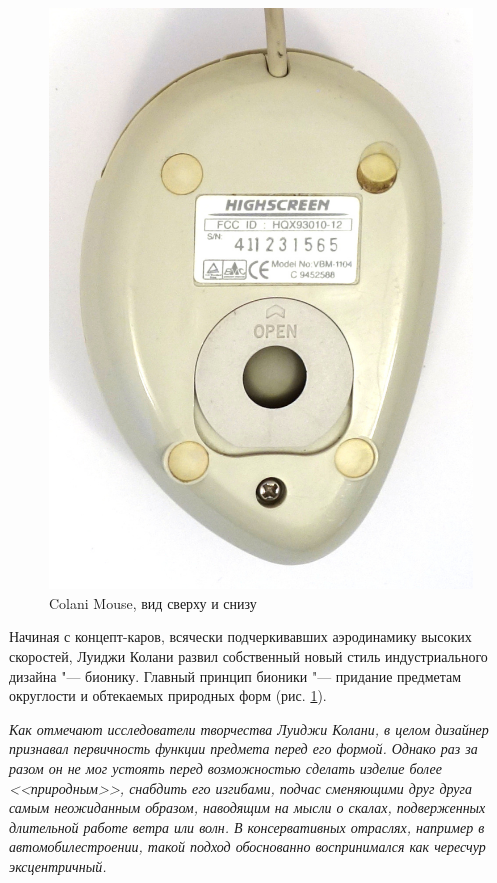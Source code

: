 \documentclass[11pt, a4paper]{article}
\begin{document}
\begin{figure}[h]
    \includegraphics[scale=0.5]{1993_colani_mouse/bottom_30.jpg}
    \caption{Colani Mouse, вид сверху и снизу}
    \label{fig:ColaniMouseTopBottom}
\end{figure}

Начиная с концепт-каров, всячески подчеркивавших аэродинамику высоких скоростей, Луиджи Колани развил собственный новый стиль индустриального дизайна "--- бионику. Главный принцип бионики "--- придание предметам округлости и обтекаемых природных форм (рис. \ref{fig:ColaniMouseTopBottom}).

\textit{Как отмечают исследователи творчества Луиджи Колани, в целом дизайнер признавал первичность функции предмета перед его формой. Однако раз за разом он не мог устоять перед возможностью сделать изделие более <<природным>>, снабдить его изгибами, подчас сменяющими друг друга самым неожиданным образом, наводящим на мысли о скалах, подверженных длительной работе ветра или волн. В консервативных отраслях, например в автомобилестроении, такой подход обоснованно воспринимался как чересчур эксцентричный.}
\end{document}
